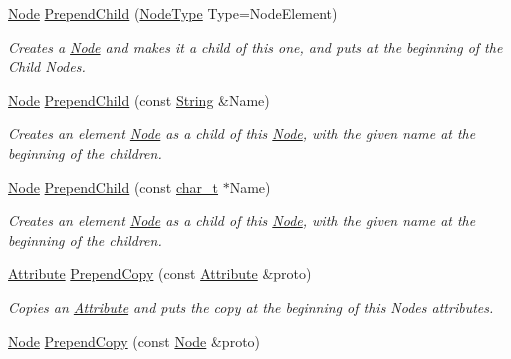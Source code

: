 \begin{DoxyCompactItemize}
\hyperlink{classphys_1_1xml_1_1Node}{Node} \hyperlink{classphys_1_1xml_1_1Node_a959da20ad42a837b64889008247a5c21}{PrependChild} (\hyperlink{namespacephys_1_1xml_a668b0cc666a9d49f7c7222a7552115d3}{NodeType} Type=NodeElement)
\begin{DoxyCompactList}\small\item\em Creates a \hyperlink{classphys_1_1xml_1_1Node}{Node} and makes it a child of this one, and puts at the beginning of the Child Nodes. \item\end{DoxyCompactList}\item 
\hyperlink{classphys_1_1xml_1_1Node}{Node} \hyperlink{classphys_1_1xml_1_1Node_aee1b13d02496e9db9f422c5df53cd132}{PrependChild} (const \hyperlink{namespacephys_1_1xml_a4d8ca7638328d16d303e5a4c849f4704}{String} \&Name)
\begin{DoxyCompactList}\small\item\em Creates an element \hyperlink{classphys_1_1xml_1_1Node}{Node} as a child of this \hyperlink{classphys_1_1xml_1_1Node}{Node}, with the given name at the beginning of the children. \item\end{DoxyCompactList}\item 
\hyperlink{classphys_1_1xml_1_1Node}{Node} \hyperlink{classphys_1_1xml_1_1Node_a0956c7a882dcca4d19f0b5e3f6e4f89f}{PrependChild} (const \hyperlink{namespacephys_1_1xml_afc87705cd1c2917d87b879715a2d8f6e}{char\_\-t} $\ast$Name)
\begin{DoxyCompactList}\small\item\em Creates an element \hyperlink{classphys_1_1xml_1_1Node}{Node} as a child of this \hyperlink{classphys_1_1xml_1_1Node}{Node}, with the given name at the beginning of the children. \item\end{DoxyCompactList}\item 
\hyperlink{classphys_1_1xml_1_1Attribute}{Attribute} \hyperlink{classphys_1_1xml_1_1Node_ae5bd358ec34b0c49c6e8caea073bcde6}{PrependCopy} (const \hyperlink{classphys_1_1xml_1_1Attribute}{Attribute} \&proto)
\begin{DoxyCompactList}\small\item\em Copies an \hyperlink{classphys_1_1xml_1_1Attribute}{Attribute} and puts the copy at the beginning of this Nodes attributes. \item\end{DoxyCompactList}\item 
\hyperlink{classphys_1_1xml_1_1Node}{Node} \hyperlink{classphys_1_1xml_1_1Node_a39b55aafd5a79bcd8dc5fdaed1a0ef10}{PrependCopy} (const \hyperlink{classphys_1_1xml_1_1Node}{Node} \&proto)

\end{DoxyCompactItemize}
